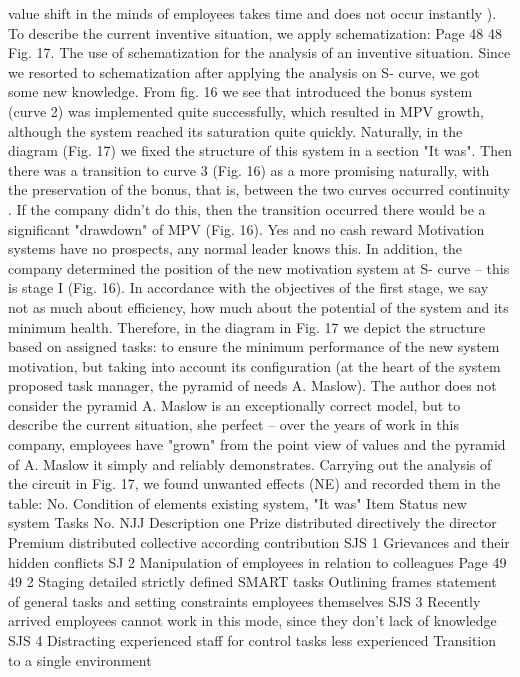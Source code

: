 value shift in the minds of employees takes time and does not occur
instantly ).
To describe the current inventive situation, we apply
schematization:
Page 48
48
Fig. 17. The use of schematization for the analysis of an inventive situation.
Since we resorted to schematization after applying the analysis on S-
curve, we got some new knowledge. From fig. 16 we see that introduced
the bonus system (curve 2) was implemented quite successfully, which resulted in
MPV growth, although the system reached its saturation quite quickly.
Naturally, in the diagram (Fig. 17) we fixed the structure of this system in a section
"It was".
Then there was a transition to curve 3 (Fig. 16) as a more promising
naturally, with the preservation of the bonus, that is, between the two curves occurred
continuity . If the company didn’t do this, then the transition occurred
there would be a significant "drawdown" of MPV (Fig. 16). Yes and no cash reward
Motivation systems have no prospects, any normal leader knows this.
In addition, the company determined the position of the new motivation system at S-
curve -- this is stage I (Fig. 16). In accordance with the objectives of the first stage, we say not
as much about efficiency, how much about the potential of the system and its minimum
health. Therefore, in the diagram in Fig. 17 we depict the structure based on
assigned tasks: to ensure the minimum performance of the new system
motivation, but taking into account its configuration (at the heart of the system proposed
task manager, the pyramid of needs A. Maslow). The author does not consider the pyramid
A. Maslow is an exceptionally correct model, but to describe the current situation, she
perfect -- over the years of work in this company, employees have "grown" from the point
view of values ​​and the pyramid of A. Maslow it simply and reliably demonstrates.
Carrying out the analysis of the circuit in Fig. 17, we found unwanted effects
(NE) and recorded them in the table:
No. Condition of elements
existing
system, "It was"
Item Status
new system
Tasks
No.
NJJ Description
one
Prize
distributed
directively
the director
Premium distributed
collective according
contribution
SJS 1
Grievances and their hidden
conflicts
SJ 2
Manipulation of employees in relation
to colleagues
Page 49
49
2
Staging
detailed
strictly defined
SMART tasks
Outlining frames
statement of general tasks
and setting constraints
employees themselves
SJS 3
Recently arrived employees cannot
work in this mode, since they don’t
lack of knowledge
SJS 4
Distracting experienced staff for
control tasks less
experienced
Transition to a single environment
